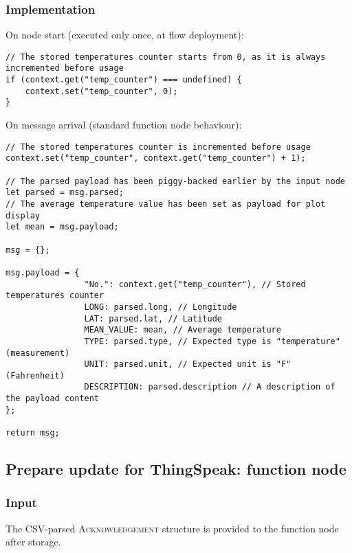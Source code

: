 \documentclass[a4paper,11pt]{article} %
\begin{document}
    \subsubsection{Implementation}

    On node start (executed only once, at flow deployment):

    \begin{verbatim}
// The stored temperatures counter starts from 0, as it is always incremented before usage
if (context.get("temp_counter") === undefined) {
    context.set("temp_counter", 0);
}
    \end{verbatim}

    On message arrival (standard function node behaviour):

    \begin{verbatim}
// The stored temperatures counter is incremented before usage
context.set("temp_counter", context.get("temp_counter") + 1);

// The parsed payload has been piggy-backed earlier by the input node
let parsed = msg.parsed;
// The average temperature value has been set as payload for plot display
let mean = msg.payload;

msg = {};

msg.payload = {
                "No.": context.get("temp_counter"), // Stored temperatures counter
                LONG: parsed.long, // Longitude
                LAT: parsed.lat, // Latitude
                MEAN_VALUE: mean, // Average temperature
                TYPE: parsed.type, // Expected type is "temperature" (measurement)
                UNIT: parsed.unit, // Expected unit is "F" (Fahrenheit)
                DESCRIPTION: parsed.description // A description of the payload content
};

return msg;
    \end{verbatim}

    \subsection{Prepare update for ThingSpeak: function node}\label{subsec:prepare-update-for-thingspeak:-function-node}

    \subsubsection{Input}

    The CSV-parsed \textsc{Acknowledgement} structure is provided to the function node after storage.
\end{document}
